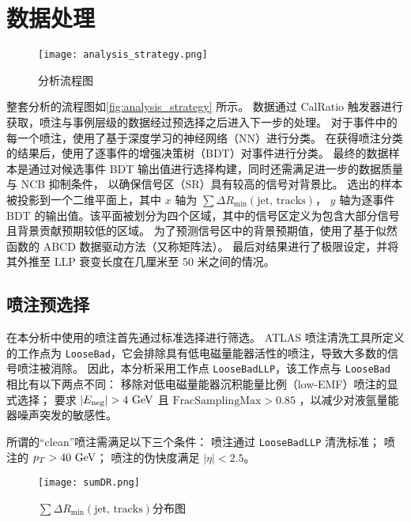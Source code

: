 \section{数据处理}
\begin{figure}[ht]
    \centering
    \texttt{[image: analysis\_strategy.png]}
    \caption{分析流程图}
    \label{fig:analysis_strategy}
\end{figure}

整套分析的流程图如\autoref{fig:analysis_strategy} 所示。
数据通过 CalRatio 触发器进行获取，喷注与事例层级的数据经过预选择之后进入下一步的处理。
对于事件中的每一个喷注，使用了基于深度学习的神经网络（NN）进行分类。
在获得喷注分类的结果后，使用了逐事件的增强决策树（BDT）对事件进行分类。
最终的数据样本是通过对候选事件 BDT 输出值进行选择构建，同时还需满足进一步的数据质量与 NCB 抑制条件，
以确保信号区（SR）具有较高的信号对背景比。
选出的样本被投影到一个二维平面上，其中 $x$ 轴为 $\sum \Delta R_{\min}(\text{jet, tracks})$，
$y$ 轴为逐事件 BDT 的输出值。该平面被划分为四个区域，其中的信号区定义为包含大部分信号且背景贡献预期较低的区域。
为了预测信号区中的背景预期值，使用了基于似然函数的 ABCD 数据驱动方法（又称矩阵法）。
最后对结果进行了极限设定，并将其外推至 LLP 衰变长度在几厘米至 50 米之间的情况。


\subsection{喷注预选择}
\label{sec:jet_preselection}

在本分析中使用的喷注首先通过标准选择进行筛选。
ATLAS 喷注清洗工具所定义的工作点为 \texttt{LooseBad}，它会排除具有低电磁量能器活性的喷注，导致大多数的信号喷注被消除。
因此，本分析采用工作点 \texttt{LooseBadLLP}，该工作点与 \texttt{LooseBad} 相比有以下两点不同：
移除对低电磁量能器沉积能量比例（low-EMF）喷注的显式选择；
要求 $ |E_{\text{neg}}| > 4~\text{GeV} $ 且 \(\text{FracSamplingMax} > 0.85\) ，以减少对液氩量能器噪声突发的敏感性。

所谓的“clean”喷注需满足以下三个条件：
喷注通过 \texttt{LooseBadLLP} 清洗标准；
喷注的 \(p_T > 40~\text{GeV} \)；
喷注的伪快度满足 \(|\eta| < 2.5\)。

\begin{figure}[ht]
    \centering
    \texttt{[image: sumDR.png]}
    \caption{$\sum \Delta R_{\text{min}}(\text{jet, tracks})$分布图}
    \label{fig:sumDR}
\end{figure}

